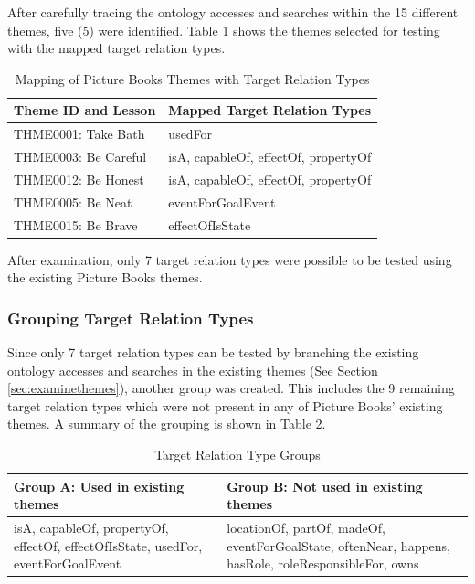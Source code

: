 After carefully tracing the ontology accesses and searches within the 15 different themes, five (5) were identified. Table \ref{tab:mapthemerel} shows the themes selected for testing with the mapped target relation types.

\begin{table}[H]   %
\centering
\caption{Mapping of Picture Books Themes with Target Relation Types} \vspace{0.25em}
\begin{tabular}{|p{5cm}|p{5cm}|} \hline
\textbf{Theme ID and Lesson} & \textbf{Mapped Target Relation Types} \\ \hline
THME0001: Take Bath			& usedFor \\ \hline
THME0003: Be Careful		& isA, capableOf, effectOf, propertyOf \\ \hline
THME0012: Be Honest			& isA, capableOf, effectOf, propertyOf \\ \hline
THME0005: Be Neat			& eventForGoalEvent \\ \hline
THME0015: Be Brave			& effectOfIsState \\ \hline
\end{tabular}
\label{tab:mapthemerel}
\end{table}  

After examination, only 7 target relation types were possible to be tested using the existing Picture Books themes.

\subsubsection*{Grouping Target Relation Types}
\label{sec:grouprel}

Since only 7 target relation types can be tested by branching the existing ontology accesses and searches in the existing themes (See Section \ref{sec:examinethemes}), another group was created. This includes the 9 remaining target relation types which were not present in any of Picture Books' existing themes. A summary of the grouping is shown in Table \ref{tab:relgroups}.

\begin{table}[H]   %
\centering
\caption{Target Relation Type Groups} \vspace{0.25em}
\begin{tabular}{|p{5cm}|p{5cm}|} \hline
\textbf{Group A: Used in existing themes} & \textbf{Group B: Not used in existing themes} \\ \hline
isA, capableOf, propertyOf, effectOf, effectOfIsState, usedFor, eventForGoalEvent	& locationOf, partOf, madeOf, eventForGoalState, oftenNear, happens, hasRole, roleResponsibleFor, owns \\ \hline
\end{tabular}
\label{tab:relgroups}
\end{table}

